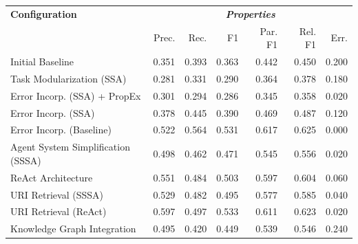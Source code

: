 \documentclass[a4paper,oneside,bibliography=totoc]{scrbook}
\begin{document}
\begin{table}[h]
  \centering
  \begin{tabular}{p{4cm}|rrrrrr}
    \toprule
    \textbf{Configuration}               & \multicolumn{6}{c}{\textit{\textbf{Properties}}}                                                                                      \\
                                         & Prec.                                            & Rec.           & F1             & Par. F1        & Rel. F1        & Err.           \\
    \midrule
    Initial Baseline                     & 0.351                                            & 0.393          & 0.363          & 0.442          & 0.450          & 0.200          \\
    Task Modularization (SSA)            & 0.281                                            & 0.331          & 0.290          & 0.364          & 0.378          & 0.180          \\
    Error Incorp. (SSA) + PropEx         & 0.301                                            & 0.294          & 0.286          & 0.345          & 0.358          & 0.020          \\
    Error Incorp. (SSA)                  & 0.378                                            & 0.445          & 0.390          & 0.469          & 0.487          & 0.120          \\
    Error Incorp. (Baseline)             & 0.522                                            & 0.564          & 0.531          & 0.617          & 0.625          & 0.000          \\
    Agent System Simplification (SSSA)   & 0.498                                            & 0.462          & 0.471          & 0.545          & 0.556          & 0.020          \\
    ReAct Architecture                   & 0.551                                            & 0.484          & 0.503          & 0.597          & 0.604          & 0.060          \\
    URI Retrieval (SSSA)                 & 0.529                                            & 0.482          & 0.495          & 0.577          & 0.585          & 0.040          \\
    URI Retrieval (ReAct)                & 0.597                                            & 0.497          & 0.533          & 0.611          & 0.623          & 0.020          \\
    Knowledge Graph Integration          & 0.495                                            & 0.420          & 0.449          & 0.539          & 0.546          & 0.240          \\

\end{tabular}
\end{table}
\end{document}
